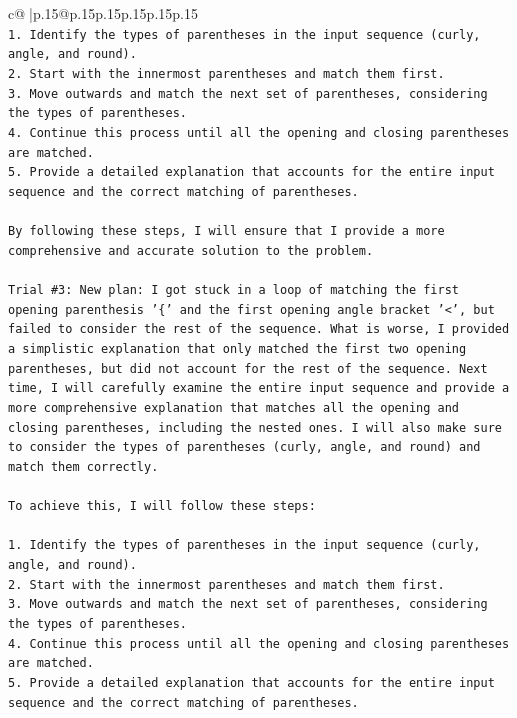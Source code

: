 \documentclass{article}
\begin{document}
{\begin{supertabular}{c@{$\;$}|p{.15\linewidth}@{}p{.15\linewidth}p{.15\linewidth}p{.15\linewidth}p{.15\linewidth}p{.15\linewidth}}
{{{\\ 
\texttt{1. Identify the types of parentheses in the input sequence (curly, angle, and round).} \\
\texttt{2. Start with the innermost parentheses and match them first.} \\
\texttt{3. Move outwards and match the next set of parentheses, considering the types of parentheses.} \\
\texttt{4. Continue this process until all the opening and closing parentheses are matched.} \\
\texttt{5. Provide a detailed explanation that accounts for the entire input sequence and the correct matching of parentheses.} \\
\\ 
\texttt{By following these steps, I will ensure that I provide a more comprehensive and accurate solution to the problem.} \\
\\ 
\texttt{Trial \#3: New plan: I got stuck in a loop of matching the first opening parenthesis '\{' and the first opening angle bracket '<', but failed to consider the rest of the sequence. What is worse, I provided a simplistic explanation that only matched the first two opening parentheses, but did not account for the rest of the sequence. Next time, I will carefully examine the entire input sequence and provide a more comprehensive explanation that matches all the opening and closing parentheses, including the nested ones. I will also make sure to consider the types of parentheses (curly, angle, and round) and match them correctly.} \\
\\ 
\texttt{To achieve this, I will follow these steps:} \\
\\ 
\texttt{1. Identify the types of parentheses in the input sequence (curly, angle, and round).} \\
\texttt{2. Start with the innermost parentheses and match them first.} \\
\texttt{3. Move outwards and match the next set of parentheses, considering the types of parentheses.} \\
\texttt{4. Continue this process until all the opening and closing parentheses are matched.} \\
\texttt{5. Provide a detailed explanation that accounts for the entire input sequence and the correct matching of parentheses.} \\
\\ 
}}}
\end{supertabular}}
\end{document}
